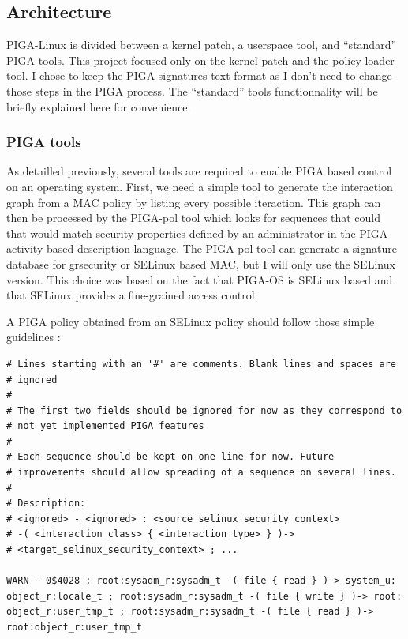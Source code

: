 \documentclass[pdftex,a4paper,titlepage,11pt]{article}
\begin{document}
\subsection{Architecture}

PIGA-Linux is divided between a kernel patch, a userspace tool, and ``standard''
PIGA tools. This project focused only on the kernel patch and the policy loader
tool. I chose to keep the PIGA signatures text format as I don't need to change
those steps in the PIGA process. The ``standard'' tools functionnality will be
briefly explained here for convenience.

\subsubsection{PIGA tools}

As detailled previously, several tools are required to enable PIGA based control
on an operating system. First, we need a simple tool to generate the
interaction graph from a MAC policy by listing every possible iteraction. This
graph can then be processed by the PIGA-pol tool which looks for sequences that
could that would match security properties defined by an administrator in the
PIGA activity based description language. The PIGA-pol tool can generate a
signature database for grsecurity or SELinux based MAC, but I will only use the
SELinux version. This choice was based on the fact that PIGA-OS is SELinux based
and that SELinux provides a fine-grained access control.

A PIGA policy obtained from an SELinux policy should follow those simple
guidelines :

\begin{lstlisting}
# Lines starting with an '#' are comments. Blank lines and spaces are
# ignored
#
# The first two fields should be ignored for now as they correspond to
# not yet implemented PIGA features
#
# Each sequence should be kept on one line for now. Future
# improvements should allow spreading of a sequence on several lines.
#
# Description:
# <ignored> - <ignored> : <source_selinux_security_context>
# -( <interaction_class> { <interaction_type> } )->
# <target_selinux_security_context> ; ...

WARN - 0$4028 : root:sysadm_r:sysadm_t -( file { read } )-> system_u:
object_r:locale_t ; root:sysadm_r:sysadm_t -( file { write } )-> root:
object_r:user_tmp_t ; root:sysadm_r:sysadm_t -( file { read } )->
root:object_r:user_tmp_t
\end{lstlisting}
\end{document}
